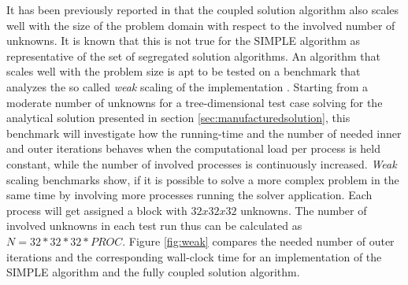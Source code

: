 It has been previously reported in \cite{darwish09,vakilipour12} that the coupled solution algorithm also scales well with the size of the problem domain with respect to the involved number of unknowns. It is known that this is not true for the SIMPLE algorithm as representative of the set of segregated solution algorithms. An algorithm that scales well with the problem size is apt to be tested on a benchmark that analyzes the so called \emph{weak} scaling of the implementation \cite{hager11}. Starting from a moderate number of unknowns for a tree-dimensional test case solving for the analytical solution presented in section \ref{sec:manufacturedsolution}, this benchmark will investigate how the running-time and the number of needed inner and outer iterations behaves when the computational load per process is held constant, while the number of involved processes is continuously increased. \emph{Weak} scaling benchmarks show, if it is possible to solve a more complex problem in the same time by involving more processes running the solver application. Each process will get assigned a block with \(32x32x32\) unknowns. The number of involved unknowns in each test run thus can be calculated as \( N = 32*32*32*PROC \). Figure \ref{fig:weak} compares the needed number of outer iterations and the corresponding wall-clock time for an implementation of the SIMPLE algorithm and the fully coupled solution algorithm.


